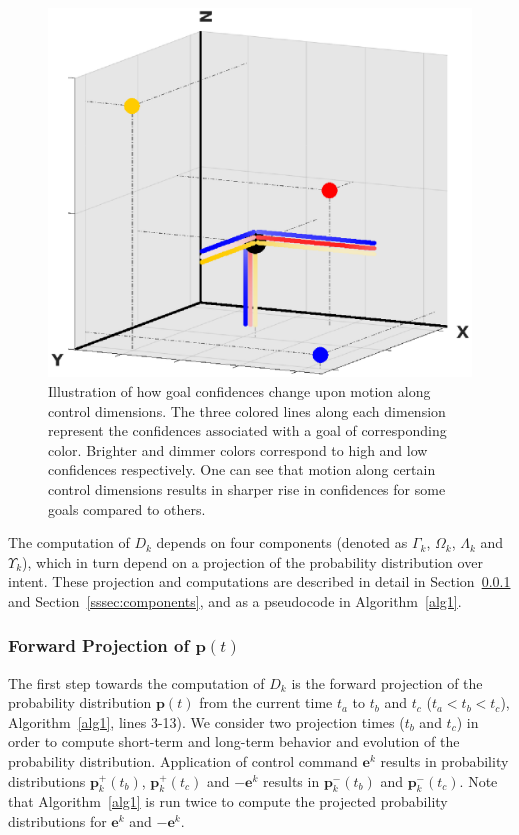 \documentclass[natbib, twocolumn]{svjour3}          %
\begin{document}
\begin{figure}[h]
	\centering
	\includegraphics[width = 1\hsize]{Fig3.eps}
	\caption{Illustration of how goal confidences change upon motion along control dimensions. The three colored lines along each dimension represent the confidences associated with a goal of corresponding color. Brighter and dimmer colors correspond to high and low confidences respectively. One can see that motion along certain control dimensions results in sharper rise in confidences for some goals compared to others.}
	\label{fig:disamb_motivation}
\end{figure}
The computation of $D_k$ depends on four components (denoted as $\Gamma_k$, $\Omega_k$, $\Lambda_k$ and $\Upsilon_k$), which in turn depend on a projection of the probability distribution over intent. These projection and computations are described in detail in Section~\ref{sssec:projection} and Section~\ref{sssec:components}, and as a pseudocode in Algorithm~\ref{alg1}. 


\subsubsection{Forward Projection of $\boldsymbol{p}(t)$}\label{sssec:projection}
The first step towards the computation of $D_k$ is the forward projection of the probability distribution $\boldsymbol{p}(t)$ from the current time $t_a$ to $t_b$ and $t_c$ ($t_a < t_b < t_c$), Algorithm~\ref{alg1}, lines 3-13). We consider two projection times ($t_b$ and $t_c$) in order to compute short-term and long-term behavior and evolution of the probability distribution. Application of control command $\boldsymbol{e}^k$ results in probability distributions $\boldsymbol{p}^+_k(t_b)$, $\boldsymbol{p}^+_k(t_c)$ and $-\boldsymbol{e}^k$ results in $\boldsymbol{p}^-_k(t_b)$ and $\boldsymbol{p}^-_k(t_c)$. Note that Algorithm~\ref{alg1} is run twice to compute the projected probability distributions for $\boldsymbol{e}^k$ and $-\boldsymbol{e}^k$.
\end{document}
